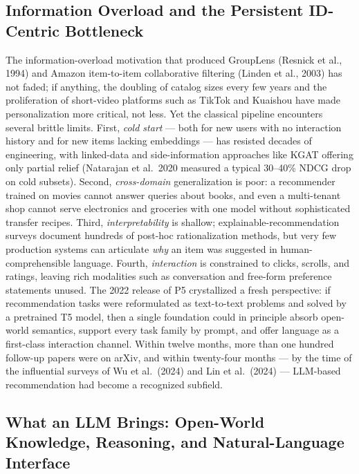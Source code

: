 \documentclass{article}
\begin{document}
\subsection{Information Overload and the Persistent ID-Centric Bottleneck}\label{information-overload-and-the-persistent-id-centric-bottleneck}

The information-overload motivation that produced GroupLens (Resnick et al., 1994) and Amazon item-to-item collaborative filtering (Linden et al., 2003) has not faded; if anything, the doubling of catalog sizes every few years and the proliferation of short-video platforms such as TikTok and Kuaishou have made personalization more critical, not less. Yet the classical pipeline encounters several brittle limits. First, \emph{cold start} --- both for new users with no interaction history and for new items lacking embeddings --- has resisted decades of engineering, with linked-data and side-information approaches like KGAT \citep{wang2018www2018} offering only partial relief (Natarajan et al.~2020 measured a typical 30--40\% NDCG drop on cold subsets). Second, \emph{cross-domain} generalization is poor: a recommender trained on movies cannot answer queries about books, and even a multi-tenant shop cannot serve electronics and groceries with one model without sophisticated transfer recipes. Third, \emph{interpretability} is shallow; explainable-recommendation surveys \citep{zhang2020foundationsandtren} document hundreds of post-hoc rationalization methods, but very few production systems can articulate \emph{why} an item was suggested in human-comprehensible language. Fourth, \emph{interaction} is constrained to clicks, scrolls, and ratings, leaving rich modalities such as conversation and free-form preference statements unused. The 2022 release of P5 \citep{geng2022recsys2022} crystallized a fresh perspective: if recommendation tasks were reformulated as text-to-text problems and solved by a pretrained T5 model, then a single foundation could in principle absorb open-world semantics, support every task family by prompt, and offer language as a first-class interaction channel. Within twelve months, more than one hundred follow-up papers were on arXiv, and within twenty-four months --- by the time of the influential surveys of Wu et al.~(2024) and Lin et al.~(2024) --- LLM-based recommendation had become a recognized subfield.

\subsection{What an LLM Brings: Open-World Knowledge, Reasoning, and Natural-Language Interface}\label{what-an-llm-brings-open-world-knowledge-reasoning-and-natural-language-interface}
\end{document}
